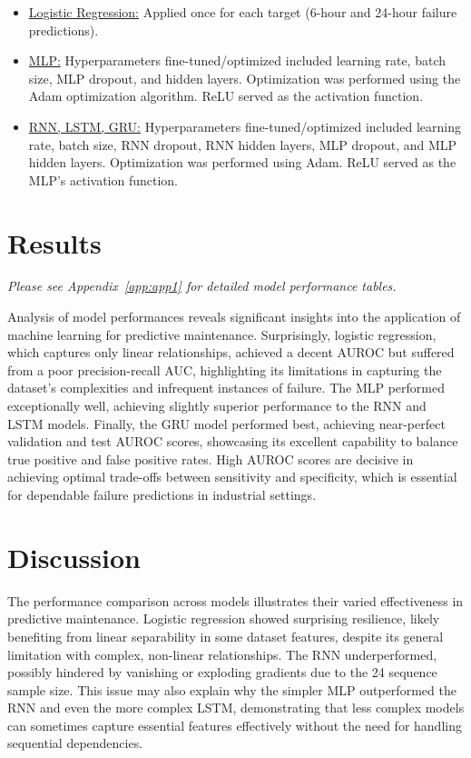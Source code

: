 \documentclass{article}
\begin{document}
\begin{itemize}
    \item \uline{Logistic Regression:} Applied once for each target (6-hour and 24-hour failure predictions).

    \item \uline{MLP:} Hyperparameters fine-tuned/optimized included learning rate, batch size, MLP dropout, and hidden layers. Optimization was performed using the Adam optimization algorithm. ReLU served as the activation function.

    \item \uline{RNN, LSTM, GRU:} Hyperparameters fine-tuned/optimized included learning rate, batch size, RNN dropout, RNN hidden layers, MLP dropout, and MLP hidden layers. Optimization was performed using Adam. ReLU served as the MLP's activation function.
    
\end{itemize}

\section{Results}

\itshape Please see Appendix~\ref{app:app1} for detailed model performance tables. \upshape

Analysis of model performances reveals significant insights into the application of machine learning for predictive maintenance. Surprisingly, logistic regression, which captures only linear relationships, achieved a decent AUROC but suffered from a poor precision-recall AUC, highlighting its limitations in capturing the dataset's complexities and infrequent instances of failure. The MLP performed exceptionally well, achieving slightly superior performance to the RNN and LSTM models. Finally, the GRU model performed best, achieving near-perfect validation and test AUROC scores, showcasing its excellent capability to balance true positive and false positive rates. High AUROC scores are decisive in achieving optimal trade-offs between sensitivity and specificity, which is essential for dependable failure predictions in industrial settings.

\section{Discussion}
\label{discussion}

The performance comparison across models illustrates their varied effectiveness in predictive maintenance. Logistic regression showed surprising resilience, likely benefiting from linear separability in some dataset features, despite its general limitation with complex, non-linear relationships. The RNN underperformed, possibly hindered by vanishing or exploding gradients due to the 24 sequence sample size. This issue may also explain why the simpler MLP outperformed the RNN and even the more complex LSTM, demonstrating that less complex models can sometimes capture essential features effectively without the need for handling sequential dependencies.
\end{document}
